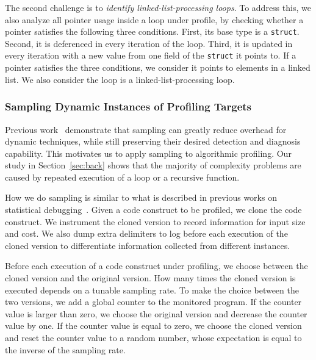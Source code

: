 The second challenge is to \emph{identify linked-list-processing loops}.
To address this, we also analyze all pointer usage inside a loop under profile, 
by checking whether a pointer satisfies the following three conditions.
First, its base type is a \texttt{struct}.
Second, it is deferenced in every iteration of the loop.
Third, it is updated in every iteration with a new value 
from one field of the \texttt{struct} it points to.
If a pointer satisfies the three conditions, 
we consider it points to elements in a linked list.
We also consider the loop is a linked-list-processing loop. 



\subsubsection{Sampling Dynamic Instances of Profiling Targets}


Previous work~\cite{liblit03,liblit05,CCI,SongOOPSLA2014,ldoctor}
demonstrate that sampling can greatly 
reduce overhead for dynamic techniques,
while still preserving their desired 
detection and diagnosis capability. 
This motivates us to apply sampling to algorithmic profiling. 
Our study in Section~\ref{sec:back} shows that 
the majority of complexity problems are caused by repeated execution of a loop
or a recursive function. 


How we do sampling is similar to what is described in previous works 
on statistical debugging~\cite{liblit03,liblit05,CCI,SongOOPSLA2014,ldoctor}.
Given a code construct to be profiled, 
we clone the code construct.
We instrument the cloned version to record information for input size and cost.
We also dump extra delimiters to log before each 
execution of the cloned version
to differentiate information collected from different instances. 


Before each execution of a code construct under profiling, 
we choose between the cloned version and the original version. 
How many times the cloned version is executed 
depends on a tunable sampling rate. 
To make the choice between the two versions,
we add a global counter to the monitored program. 
If the counter value is larger than zero, 
we choose the original version and decrease the counter value by one.
If the counter value is equal to zero,
we choose the cloned version and reset the counter value to 
a random number, 
whose expectation is 
equal to the inverse of the sampling rate.  

